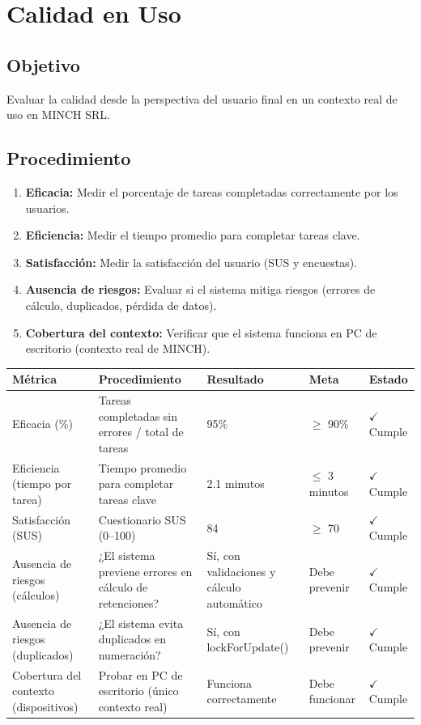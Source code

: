 \documentclass[stu]{apa7}
\begin{document}
\section{Calidad en Uso}

\subsection{Objetivo}

Evaluar la calidad desde la perspectiva del usuario final en un contexto real de uso en MINCH SRL.

\subsection{Procedimiento}

\begin{enumerate}
    \item \textbf{Eficacia:} Medir el porcentaje de tareas completadas correctamente por los usuarios.
    \item \textbf{Eficiencia:} Medir el tiempo promedio para completar tareas clave.
    \item \textbf{Satisfacción:} Medir la satisfacción del usuario (SUS y encuestas).
    \item \textbf{Ausencia de riesgos:} Evaluar si el sistema mitiga riesgos (errores de cálculo, duplicados, pérdida de datos).
    \item \textbf{Cobertura del contexto:} Verificar que el sistema funciona en PC de escritorio (contexto real de MINCH).
\end{enumerate}

\begin{longtable}{|L{4.5cm}|L{3.5cm}|C{2.5cm}|C{2cm}|C{1.5cm}|}
\hline
{}
\textbf{Métrica} & \textbf{Procedimiento} & \textbf{Resultado} & \textbf{Meta} & \textbf{Estado} \\
\hline
Eficacia (\%) & Tareas completadas sin errores / total de tareas & 95\% & $\geq$ 90\% & $\checkmark$ Cumple \\
\hline
Eficiencia (tiempo por tarea) & Tiempo promedio para completar tareas clave & 2.1 minutos & $\leq$ 3 minutos & $\checkmark$ Cumple \\
\hline
Satisfacción (SUS) & Cuestionario SUS (0--100) & 84 & $\geq$ 70 & $\checkmark$ Cumple \\
\hline
Ausencia de riesgos (cálculos) & ¿El sistema previene errores en cálculo de retenciones? & Sí, con validaciones y cálculo automático & Debe prevenir & $\checkmark$ Cumple \\
\hline
Ausencia de riesgos (duplicados) & ¿El sistema evita duplicados en numeración? & Sí, con lockForUpdate() & Debe prevenir & $\checkmark$ Cumple \\
\hline
Cobertura del contexto (dispositivos) & Probar en PC de escritorio (único contexto real) & Funciona correctamente & Debe funcionar & $\checkmark$ Cumple \\
\hline
\end{longtable}
\end{document}
